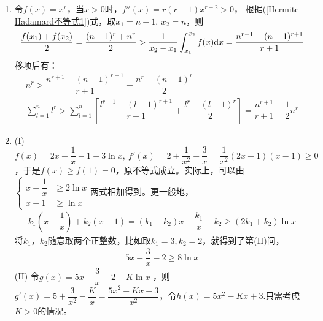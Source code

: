 \begin{enumerate}[label={\textbf{\arabic*.}},leftmargin=
    \inteval{\myenumleftmargin}pt]
即可得(\ref{凹凸性习题-伯努利不等式})式成立。\\
(5) $ p\e^{x_1}+q\e^{x_2}\geq \e^{px_1+qx_2} $，令$ \e^{x_1}=u_1>0 $，
$ \e^{x_2}=u_2>0 $，则只需证$ pu_1+qu_2\geq u_1^pu_2^q $，这就是(4)的结果。\\
(6) 
\begin{gather*}
    \dfrac{1}{4}(x_1^2+2+2\sqrt{x_1^2+2}\sqrt{x_2^2+2}+x_2^2+2)\geq 
    \dfrac{1}{4}(x_1^2+2x_1x_2+x_2^2)+2 \q \Leftrightarrow \\
    \sqrt{x_1^2+2}\sqrt{x_2^2+2}\geq x_1x_2+2 \q \text{(两边平方即可证明)}
\end{gather*}
(7) 要证$ \dfrac{1}{2}(x_1\ln x_1+x_2\ln x_2)\geq \dfrac{x_1+x_2}{2}
\ln \dfrac{x_1+x_2}{2} $，可以固定$ x_1 $，以$ x_2 $为变量，
然后对$ x_2 $求导，过程略。\\
(8)把(7)中的$ x_i $换成$ \e^{x_i} $即得。\\
请读者分别计算以上各个函数的二阶导数，并判断其正负号，再结合函数图像
体会二阶导数的正负与凹凸性的关系。

\item 
令$ f(x)=x^r $，当$ x>0 $时，$ f''(x)=r(r-1)x^{r-2}>0 $，
根据(\ref{Hermite-Hadamard不等式1})式，取$ x_1=n-1,\ x_2=n $，则
\begin{gather*}
    \dfrac{f(x_1)+f(x_2)}{2}=\dfrac{(n-1)^r+n^r}{2}>
    \dfrac{1}{x_2-x_1}\int_{x_1}^{x_2}f(x)\mathrm{d} x=\dfrac{n^{r+1}-(n-1)^{r+1}}{r+1}
\end{gather*}
移项后有：
\begin{gather*}
    n^r > \dfrac{n^{r+1}-(n-1)^{r+1}}{r+1}+\dfrac{n^{r}-(n-1)^{r}}{2} \\
    \sum\limits_{l=1}^n l^r>\sum_{l=1}^n
    \left[\dfrac{l^{r+1}-(l-1)^{r+1}}{r+1}+\dfrac{l^{r}-(l-1)^{r}}{2}\right]=
    \dfrac{n^{r+1}}{r+1}+\dfrac{1}{2}n^r
\end{gather*}

\item (I)
$ f(x)=2x-\dfrac{1}{x}-1-3\ln x,\ f'(x)=2+\dfrac{1}{x^2}-\dfrac{3}{x}=\dfrac{1}{x^2}
(2x-1)(x-1)\geq 0 $，于是$ f(x)\geq f(1)=0 $，原不等式成立。实际上，可以由$ \begin{cases}
    x-\dfrac{1}{x} & \geq 2\ln x\\
    x-1 & \geq \ln x
\end{cases}$两式相加得到。更一般地，
\begin{gather*}
    k_1\left(x-\dfrac{1}{x}\right)+k_2(x-1)=(k_1+k_2)x-\dfrac{k_1}{x}-k_2
    \geq (2k_1+k_2)\ln x 
\end{gather*}
将$k_1，k_2 $随意取两个正整数，比如取$ k_1=3,k_2=2 $，就得到了第(II)问，
\begin{gather*}
    5x-\dfrac{3}{x}-2\geq 8\ln x
\end{gather*}
(II) 令$ g(x)=5x-\dfrac{3}{x}-2-K\ln x$ ，则$ g'(x)=5+\dfrac{3}{x^2}-\dfrac{K}{x}=\dfrac{5x^2-Kx+3}{x^2} $，令$ h(x)=5x^2-Kx+3 $.只需考虑$ K>0 $的情况。 


\end{enumerate}
